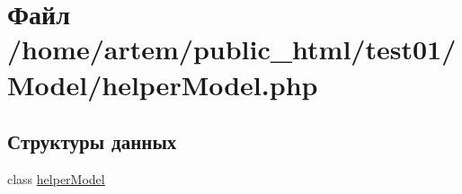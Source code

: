 \hypertarget{helper_model_8php}{\section{Файл /home/artem/public\-\_\-html/test01/\-Model/helper\-Model.php}
\label{helper_model_8php}
}
\subsection*{Структуры данных}
\begin{DoxyCompactItemize}
\item 
class \hyperlink{classhelper_model}{helper\-Model}
\end{DoxyCompactItemize}
